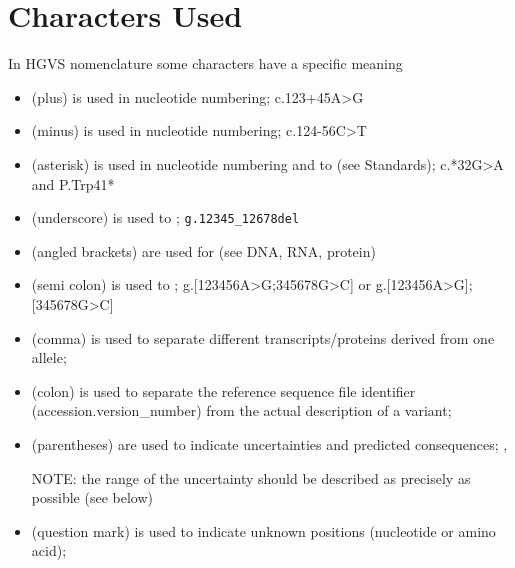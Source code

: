 \section{Characters Used}

In HGVS nomenclature some characters have a specific meaning

\begin{itemize}
	\item \myDoubleQuoteEnglish{+} (plus) is used in nucleotide numbering; c.123+45A>G
	
	\item \myDoubleQuoteEnglish{-} (minus) is used in nucleotide numbering; c.124-56C>T
	
	\item \myDoubleQuoteEnglish{*} (asterisk) is used in nucleotide numbering and to  (see Standards); c.*32G>A and P.Trp41*
	
	\item \myDoubleQuoteEnglish{\_} (underscore) is used to ; \verb|g.12345_12678del|
	
	\item \myDoubleQuoteEnglish{[ ]} (angled brackets) are used for  (see DNA, RNA, protein) 
	
	\item \myDoubleQuoteEnglish{;} (semi colon) is used to ; g.[123456A>G;345678G>C] or g.[123456A>G];[345678G>C]
	
	\item \myDoubleQuoteEnglish{,} (comma) is used to separate different transcripts/proteins derived from one allele; 
	
	\item \myDoubleQuoteEnglish{:} (colon) is used to separate the reference sequence file identifier (accession.version\_number) from the actual description of a variant; 
	
	\item \myDoubleQuoteEnglish{( )} (parentheses) are used to indicate uncertainties and predicted consequences; , 
	
	NOTE: the range of the uncertainty should be described as precisely as possible (see below)
	
	\item {} (question mark) is used to indicate unknown positions (nucleotide or amino acid); 
	

\end{itemize}
